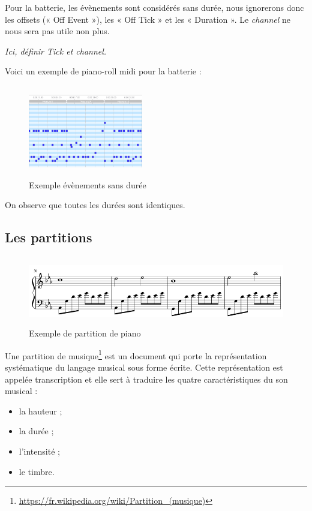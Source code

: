 Pour la batterie, les évènements sont considérés sans durée, nous ignorerons donc les offsets (« Off Event »), les « Off Tick » et les « Duration ». 
Le \textit{channel} ne nous sera pas utile non plus.

\textit{Ici, définir Tick et channel.}

Voici un exemple de piano-roll midi pour la batterie :
\begin{figure}[h!]
	\centering
	\includegraphics[height=40mm, width=50mm]{z_images/1_contexte/4_midi_batterie.png}
	\caption{Exemple évènements sans durée}
\end{figure}

On observe que toutes les durées sont identiques.
\subsection*{Les partitions}
\begin{figure}[h!]
	\centering
	\includegraphics[height=30mm, width=120mm]{z_images/1_contexte/5_partition_piano.png}
	\caption{Exemple de partition de piano}
\end{figure}

Une partition de musique\footnote{\url{https://fr.wikipedia.org/wiki/Partition\_(musique)}} est un document qui porte la représentation systématique du langage musical sous forme écrite. Cette représentation est appelée transcription et elle sert à traduire les quatre caractéristiques du son musical :
\begin{itemize}
	\item la hauteur ;
	\item la durée ;
	\item l’intensité ;
	\item le timbre.
\end{itemize}

